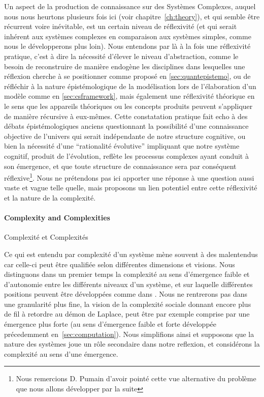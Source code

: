 Un aspect de la production de connaissance sur des Systèmes Complexes, auquel nous nous heurtons plusieurs fois ici (voir chapitre~\ref{ch:theory}), et qui semble être récurrent voire inévitable, est un certain niveau de réflexivité (et qui serait inhérent aux systèmes complexes en comparaison aux systèmes simples, comme nous le développerons plus loin). Nous entendons par là à la fois une réflexivité pratique, c'est à dire la nécessité d'élever le niveau d'abstraction, comme le besoin de reconstruire de manière endogène les disciplines dans lesquelles une réflexion cherche à se positionner comme proposé en \ref{sec:quantepistemo}, ou de réfléchir à la nature épistémologique de la modélisation lors de l'élaboration d'un modèle comme en \ref{sec:csframework}, mais également une réflexivité théorique en le sens que les appareils théoriques ou les concepts produits peuvent s'appliquer de manière récursive à eux-mêmes. Cette constatation pratique fait echo à des débats épistémologiques anciens questionnant la possibilité d'une connaissance objective de l'univers qui serait indépendante de notre structure cognitive, ou bien la nécessité d'une ``rationalité évolutive'' impliquant que notre système cognitif, produit de l'évolution, reflète les processus complexes ayant conduit à son émergence, et que toute structure de connaissance sera par conséquent réflexive\footnote{Nous remercions D. Pumain d'avoir pointé cette vue alternative du problème que nous allons développer par la suite}. Nous ne prétendons pas ici apporter une réponse à une question aussi vaste et vague telle quelle, mais proposons un lien potentiel entre cette réflexivité et la nature de la complexité.


\paragraph{Complexity and Complexities}{Complexité et Complexités}

Ce qui est entendu par complexité d'un système mène souvent à des malentendus car celle-ci peut être qualifiée selon différentes dimensions et visions. Nous distinguons dans un premier temps la complexité au sens d'émergence faible et d'autonomie entre les différents niveaux d'un système, et sur laquelle différentes positions peuvent être développées comme dans \cite{deffuant2015visions}. Nous ne rentrerons pas dans une granularité plus fine, la vision de la complexité sociale donnant encore plus de fil à retordre au démon de Laplace, peut être par exemple comprise par une émergence plus forte (au sens d'émergence faible et forte développée précedemment en~\ref{sec:computation}). Nous simplifions ainsi et supposons que la nature des systèmes joue un rôle secondaire dans notre reflexion, et considérons la complexité au sens d'une émergence.


